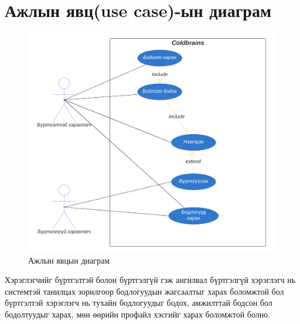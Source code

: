 \clearpage

\section{Ажлын явц(use case)-ын диаграм}

\begin{figure}[h]
  \centering
  \includegraphics{img/diagrams/coldbrains-use-case.png}
  \caption{Ажлын явцын диаграм}
\end{figure}

Хэрэглэгчийг бүртгэлтэй болон бүртгэлгүй гэж ангилвал бүртгэлгүй хэрэглэгч нь системтэй танилцах зорилгоор бодлогуудын жагсаалтыг харах боломжтой бол бүртгэлтэй хэрэглэгч нь тухайн бодлогуудыг бодох, амжилттай бодсон бол бодолтуудыг харах, мөн өөрийн профайл хэсгийг харах боломжтой болно.

\clearpage